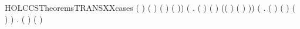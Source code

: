 \begin{SaveVerbatim}{HOLCCSTheoremsTRANSXXcases}
            ( \HOLSymConst{=}  \HOLSymConst{\ensuremath{\parallel}} ) \HOLSymConst{\HOLTokenConj{}} ( \HOLSymConst{=} \HOLConst{\ensuremath{\tau}}) \HOLSymConst{\HOLTokenConj{}} ( \HOLSymConst{=}  \HOLSymConst{\ensuremath{\parallel}} ) \HOLSymConst{\HOLTokenConj{}}
             \HOLTokenTransBegin{} \HOLTokenTransEnd {} \HOLSymConst{\HOLTokenConj{}}  \HOLTokenTransBegin{} ( )\HOLTokenTransEnd {}) \HOLSymConst{\HOLTokenDisj{}}
       (\HOLSymConst{\HOLTokenExists{}}   .
            ( \HOLSymConst{=} \HOLConst{\ensuremath{\nu}}  ) \HOLSymConst{\HOLTokenConj{}} ( \HOLSymConst{=} \HOLConst{\ensuremath{\nu}}  ) \HOLSymConst{\HOLTokenConj{}}  \HOLTokenTransBegin{}\HOLTokenTransEnd {} \HOLSymConst{\HOLTokenConj{}}
            (( \HOLSymConst{=} \HOLConst{\ensuremath{\tau}}) \HOLSymConst{\HOLTokenDisj{}} ( \HOLSymConst{=}  ) \HOLSymConst{\HOLTokenConj{}}  \HOLConst{\HOLTokenNotIn{}}  \HOLSymConst{\HOLTokenConj{}}   \HOLConst{\HOLTokenNotIn{}} )) \HOLSymConst{\HOLTokenDisj{}}
       (\HOLSymConst{\HOLTokenExists{}}   .
            ( \HOLSymConst{=}   ) \HOLSymConst{\HOLTokenConj{}} ( \HOLSymConst{=}   ) \HOLSymConst{\HOLTokenConj{}}
            ( \HOLSymConst{=}   ) \HOLSymConst{\HOLTokenConj{}}  \HOLTokenTransBegin{}\HOLTokenTransEnd {}) \HOLSymConst{\HOLTokenDisj{}}
       \HOLSymConst{\HOLTokenExists{}} . ( \HOLSymConst{=}   ) \HOLSymConst{\HOLTokenConj{}}   (  )  \HOLTokenTransBegin{}\HOLTokenTransEnd {}
\end{SaveVerbatim}
